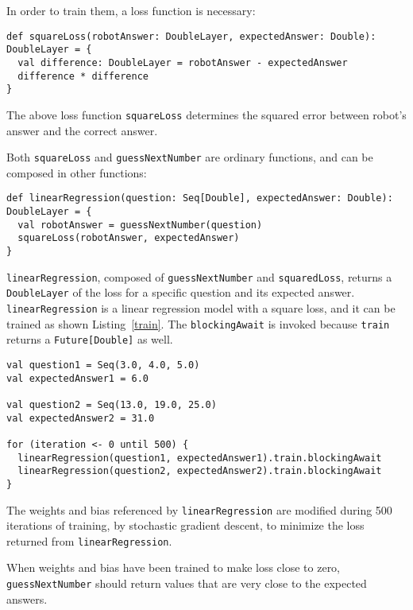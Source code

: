 In order to train them, a loss function is necessary:

\begin{lstlisting}[float={h t b p},caption={The differentiable square loss function},label={squareLoss}]
def squareLoss(robotAnswer: DoubleLayer, expectedAnswer: Double): DoubleLayer = {
  val difference: DoubleLayer = robotAnswer - expectedAnswer
  difference * difference
}
\end{lstlisting}

The above loss function \lstinline{squareLoss} determines the squared error between robot's answer and the correct answer.

Both \lstinline{squareLoss} and \lstinline{guessNextNumber} are ordinary functions, and can be composed in other functions:

\begin{lstlisting}[float={h t b p},caption={A differentiable function to train a linear regression model}]
def linearRegression(question: Seq[Double], expectedAnswer: Double): DoubleLayer = {
  val robotAnswer = guessNextNumber(question)
  squareLoss(robotAnswer, expectedAnswer)
}
\end{lstlisting}

\lstinline{linearRegression}, composed of \lstinline{guessNextNumber} and \lstinline{squaredLoss}, returns a \lstinline{DoubleLayer} of the loss for a specific question and its expected answer. \lstinline{linearRegression} is a linear regression model with a square loss, and it can be trained as shown Listing~\ref{train}. The \lstinline{blockingAwait} is invoked because \lstinline{train} returns a \lstinline{Future[Double]} as well.

\begin{lstlisting}[float={h t b p},caption={Training for 500 iterations},label={train}]
val question1 = Seq(3.0, 4.0, 5.0)
val expectedAnswer1 = 6.0

val question2 = Seq(13.0, 19.0, 25.0)
val expectedAnswer2 = 31.0

for (iteration <- 0 until 500) {
  linearRegression(question1, expectedAnswer1).train.blockingAwait
  linearRegression(question2, expectedAnswer2).train.blockingAwait
}
\end{lstlisting}

The weights and bias referenced by \lstinline{linearRegression} are modified during 500 iterations of training, by stochastic gradient descent, to minimize the loss returned from \lstinline{linearRegression}.

When weights and bias have been trained to make loss close to zero, \lstinline{guessNextNumber} should return values that are very close to the expected answers.

